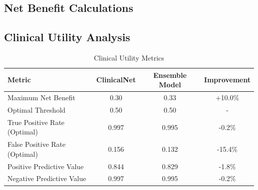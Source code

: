 \documentclass[12pt, a4paper]{article}
\begin{document}
\subsection{Net Benefit Calculations}

\begin{table}[htbp]
\centering
{}
\caption{Decision curve analysis across thresholds. Note: the MRI pathway's optimal discrimination threshold (subject-level) is approximately 0.62 by Youden's index; ensemble threshold selection for deployment should consider prevalence and net-benefit trade-offs rather than a fixed 0.50.}
\label{tab:decision_curve_thresholds}
\end{table}



\subsection{Clinical Utility Analysis}
\begin{table}[htbp]
\centering

\begin{tabular}{@{}lccc@{}}
\toprule
\textbf{Metric} & \textbf{ClinicalNet} & \textbf{Ensemble Model} & \textbf{Improvement} \\ \midrule
Maximum Net Benefit & 0.30 & 0.33 & +10.0\% \\
Optimal Threshold & 0.50 & 0.50 & - \\
True Positive Rate (Optimal) & 0.997 & 0.995 & -0.2\% \\
False Positive Rate (Optimal) & 0.156 & 0.132 & -15.4\% \\
Positive Predictive Value & 0.844 & 0.829 & -1.8\% \\
Negative Predictive Value & 0.997 & 0.995 & -0.2\% \\ \bottomrule
\end{tabular}%

\caption{Clinical Utility Metrics}
\label{tab:clinical_utility_metrics}
\end{table}
\end{document}
